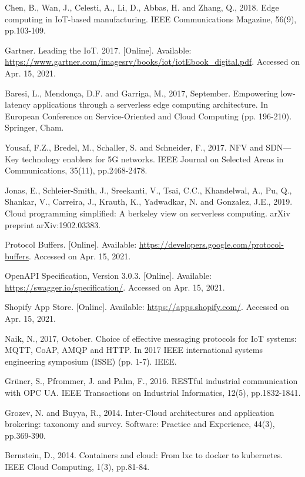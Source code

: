 \documentclass{ieeeaccess}
\begin{document}
\begin{thebibliography}{00}
 Chen, B., Wan, J., Celesti, A., Li, D., Abbas, H. and Zhang, Q., 2018. Edge computing in IoT-based manufacturing. IEEE Communications Magazine, 56(9), pp.103-109.

 Gartner. Leading the IoT. 2017. [Online]. Available: \url{https://www.gartner.com/imagesrv/books/iot/iotEbook_digital.pdf}. Accessed on Apr. 15, 2021.

 Baresi, L., Mendonça, D.F. and Garriga, M., 2017, September. Empowering low-latency applications through a serverless edge computing architecture. In European Conference on Service-Oriented and Cloud Computing (pp. 196-210). Springer, Cham.

 Yousaf, F.Z., Bredel, M., Schaller, S. and Schneider, F., 2017. NFV and SDN—Key technology enablers for 5G networks. IEEE Journal on Selected Areas in Communications, 35(11), pp.2468-2478.

 Jonas, E., Schleier-Smith, J., Sreekanti, V., Tsai, C.C., Khandelwal, A., Pu, Q., Shankar, V., Carreira, J., Krauth, K., Yadwadkar, N. and Gonzalez, J.E., 2019. Cloud programming simplified: A berkeley view on serverless computing. arXiv preprint arXiv:1902.03383.

 Protocol Buffers. [Online]. Available: \url{https://developers.google.com/protocol-buffers}. Accessed on Apr. 15, 2021.

 OpenAPI Specification, Version 3.0.3. [Online]. Available: \url{https://swagger.io/specification/}. Accessed on Apr. 15, 2021.

 Shopify App Store. [Online]. Available: \url{https://apps.shopify.com/}. Accessed on Apr. 15, 2021.

 Naik, N., 2017, October. Choice of effective messaging protocols for IoT systems: MQTT, CoAP, AMQP and HTTP. In 2017 IEEE international systems engineering symposium (ISSE) (pp. 1-7). IEEE.

 Grüner, S., Pfrommer, J. and Palm, F., 2016. RESTful industrial communication with OPC UA. IEEE Transactions on Industrial Informatics, 12(5), pp.1832-1841.

 Grozev, N. and Buyya, R., 2014. Inter‐Cloud architectures and application brokering: taxonomy and survey. Software: Practice and Experience, 44(3), pp.369-390.

 Bernstein, D., 2014. Containers and cloud: From lxc to docker to kubernetes. IEEE Cloud Computing, 1(3), pp.81-84.


\end{thebibliography}
\end{document}

